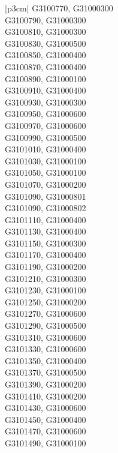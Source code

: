 \begin{customLongTable}{ |p{3cm}| }
G3100770, G31000300 \\ \hline
G3100790, G31000300 \\ \hline
G3100810, G31000300 \\ \hline
G3100830, G31000500 \\ \hline
G3100850, G31000400 \\ \hline
G3100870, G31000400 \\ \hline
G3100890, G31000100 \\ \hline
G3100910, G31000400 \\ \hline
G3100930, G31000300 \\ \hline
G3100950, G31000600 \\ \hline
G3100970, G31000600 \\ \hline
G3100990, G31000500 \\ \hline
G3101010, G31000400 \\ \hline
G3101030, G31000100 \\ \hline
G3101050, G31000100 \\ \hline
G3101070, G31000200 \\ \hline
G3101090, G31000801 \\ \hline
G3101090, G31000802 \\ \hline
G3101110, G31000400 \\ \hline
G3101130, G31000400 \\ \hline
G3101150, G31000300 \\ \hline
G3101170, G31000400 \\ \hline
G3101190, G31000200 \\ \hline
G3101210, G31000300 \\ \hline
G3101230, G31000100 \\ \hline
G3101250, G31000200 \\ \hline
G3101270, G31000600 \\ \hline
G3101290, G31000500 \\ \hline
G3101310, G31000600 \\ \hline
G3101330, G31000600 \\ \hline
G3101350, G31000400 \\ \hline
G3101370, G31000500 \\ \hline
G3101390, G31000200 \\ \hline
G3101410, G31000200 \\ \hline
G3101430, G31000600 \\ \hline
G3101450, G31000400 \\ \hline
G3101470, G31000600 \\ \hline
G3101490, G31000100 \\ \hline

\end{customLongTable}
